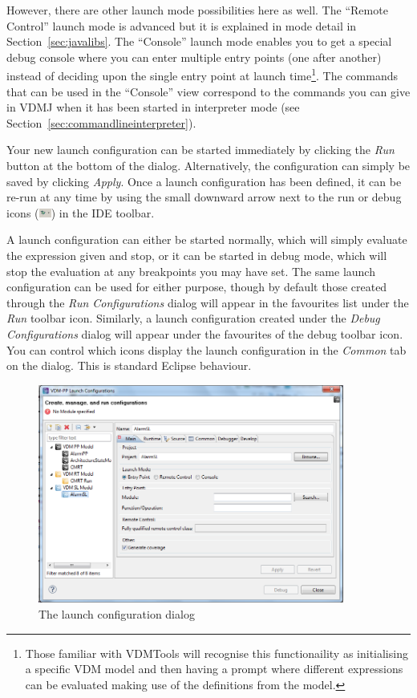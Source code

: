\documentclass{overturerepchap}
\begin{document}
However, there are other launch mode possibilities here as
well. The
``Remote Control'' launch mode is advanced but it is explained in mode
detail in Section~\ref{sec:javalibs}. The ``Console'' launch mode
enables you to get a special debug console where you can enter
multiple entry points (one after another) instead of deciding upon the
single entry point at launch time\footnote{Those familiar with
  VDMTools will recognise this functionaility as initialising a
  specific VDM model and then having a prompt where different
  expressions can be evaluated making use of the definitions from the model.}.
The commands that can be used in the ``Console'' view correspond to
the commands you can give in VDMJ when it has been started in
interpreter mode (see Section~\ref{sec:commandlineinterpreter}).

Your new launch configuration can be started immediately by clicking the \emph{Run}
button at the bottom of the dialog. Alternatively, the configuration can simply be
saved by clicking \emph{Apply}. Once a launch configuration has been defined, it
can be re-run at any time by using the small downward arrow next to the run or
debug icons (\includegraphics[width=0.03\textwidth]{icons/debuggericon})
in the IDE toolbar.

A launch configuration can either be started normally, which will simply evaluate
the expression given and stop, or it can be started in debug mode, which will
stop the evaluation at any breakpoints you may have set. The same launch configuration
can be used for either purpose, though by default those created through the
\emph{Run Configurations} dialog will appear in the favourites list under the
\emph{Run} toolbar icon. Similarly, a launch configuration created under the
\emph{Debug Configurations} dialog will appear under the favourites of the
debug toolbar icon. You can control which icons display the launch configuration
in the \emph{Common} tab on the dialog. This is standard Eclipse behaviour.


\begin{figure}[htp]
\begin{center}
  \includegraphics[width=380px]{screenDumps/launchconfig}
  \caption{The launch configuration dialog}
  \label{fig:userguide:launchconfig}
\end{center}
\end{figure}
\end{document}
